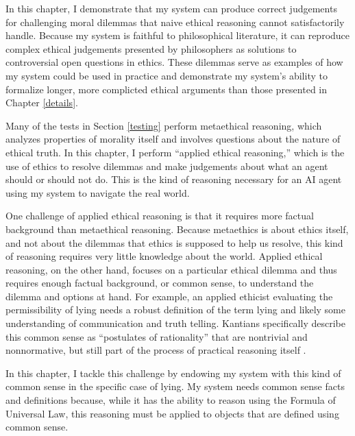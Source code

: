 %
\begin{isabellebody}%
%
%
\isadelimtheory
%
\endisadelimtheory
%
\isatagtheory
%
\endisatagtheory
{\isafoldtheory}%
%
\isadelimtheory
%
\endisadelimtheory
%
\isadelimdocument
%
\endisadelimdocument
%
\isatagdocument
%
\isamarkuptrue%
%
\endisatagdocument
{\isafolddocument}%
%
\isadelimdocument
%
\endisadelimdocument
%
\begin{isamarkuptext}%
In this chapter, I demonstrate that my system can produce correct judgements for challenging moral 
dilemmas that naive ethical reasoning cannot satisfactorily handle. Because my system is faithful to
philosophical literature, it can reproduce complex ethical judgements presented by philosophers as 
solutions to controversial open questions in ethics.
These dilemmas serve as examples of how my system could be used
in practice and demonstrate my system's ability to formalize longer, more complicted ethical arguments
than those presented in Chapter \ref{details}. 

Many of the tests in Section \ref{testing} perform metaethical reasoning, which analyzes properties
of morality itself and involves questions about the nature of ethical truth. In this chapter, I perform
``applied ethical reasoning,'' which is the use of ethics to resolve dilemmas and make judgements about 
what an agent should or should not do. This is the kind of reasoning necessary for an AI agent using my system to
navigate the real world.

One challenge of applied ethical reasoning is that it requires more factual background than metaethical
reasoning. Because metaethics is about ethics itself, and not about the dilemmas that ethics is 
supposed to help us resolve, this kind of reasoning requires very little knowledge about the world. 
Applied ethical reasoning, on the other hand,
focuses on a particular ethical dilemma and thus requires enough factual background, or common sense, 
to understand the dilemma and options at hand. For example, an applied ethicist 
evaluating the permissibility of lying needs a robust definition of the term lying and likely some
understanding of communication and truth telling. Kantians specifically describe
this common sense as ``postulates of rationality'' that are nontrivial and nonnormative, but still
part of the process of practical reasoning itself \citep{silber}. 

In this chapter, I tackle this challenge by
endowing my system with this kind of common sense in the specific case of lying. My system needs common 
sense facts and definitions because, while it has the ability to reason
using the Formula of Universal Law, this reasoning must be applied to objects that are defined
using common sense. 


\end{isamarkuptext}
\end{isabellebody}
